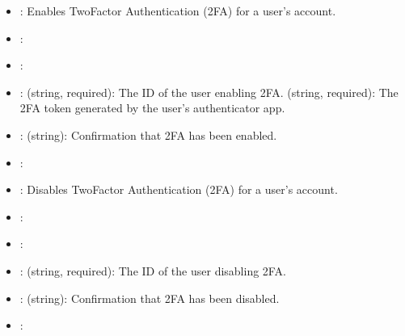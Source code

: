 \documentclass[letterpaper,10pt,english]{sphinxmanual}
\begin{document}
\sphinxAtStartPar
{}
\begin{itemize}
\item {} 
\sphinxAtStartPar
{}: Enables Two\sphinxhyphen{}Factor Authentication (2FA) for a user’s account.

\item {} 
\sphinxAtStartPar
{}: 

\item {} 
\sphinxAtStartPar
{}: 

\item {} 
\sphinxAtStartPar
{}:
\sphinxhyphen{}  (string, required): The ID of the user enabling 2FA.
\sphinxhyphen{}  (string, required): The 2FA token generated by the user’s authenticator app.

\item {} 
\sphinxAtStartPar
{}:
\sphinxhyphen{}  (string): Confirmation that 2FA has been enabled.

\item {} 
\sphinxAtStartPar
{}: 

\end{itemize}

\sphinxAtStartPar
{}
\begin{itemize}
\item {} 
\sphinxAtStartPar
{}: Disables Two\sphinxhyphen{}Factor Authentication (2FA) for a user’s account.

\item {} 
\sphinxAtStartPar
{}: 

\item {} 
\sphinxAtStartPar
{}: 

\item {} 
\sphinxAtStartPar
{}:
\sphinxhyphen{}  (string, required): The ID of the user disabling 2FA.

\item {} 
\sphinxAtStartPar
{}:
\sphinxhyphen{}  (string): Confirmation that 2FA has been disabled.

\item {} 
\sphinxAtStartPar
{}: 

\end{itemize}
\end{document}
